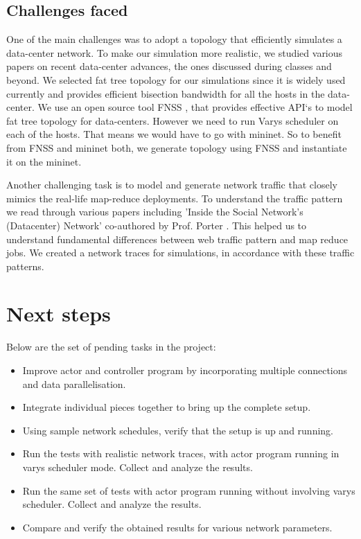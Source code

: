 \documentclass{article}
\begin{document}
\subsection{Challenges faced}
One of the main challenges was to adopt a topology that efficiently simulates a data-center network. To make our simulation more realistic, we studied various papers on recent data-center advances, the ones discussed during classes and beyond. We selected fat tree topology for our simulations since it is widely used currently and provides efficient bisection bandwidth for all the hosts in the data-center. We use an open source tool FNSS \cite{fnss}, that provides effective API`s to model fat tree topology for data-centers. However we need to run Varys scheduler on each of the hosts. That means we would have to go with mininet. So to benefit from FNSS and mininet both, we generate topology using FNSS and instantiate it on the mininet.

Another challenging task is to model and generate network traffic that closely mimics the real-life map-reduce deployments. To understand the traffic pattern we read through various papers including 'Inside the Social Network's (Datacenter) Network' co-authored by Prof. Porter \cite{facebook}. This helped us to understand fundamental differences between web traffic pattern and map reduce jobs. We created a network traces for simulations, in accordance with these traffic patterns.

\section{Next steps}

Below are the set of pending tasks in the project:

\begin{itemize}
\item Improve actor and controller program by incorporating multiple connections and data parallelisation.
\item Integrate individual pieces together to bring up the complete setup.
\item Using sample network schedules, verify that the setup is up and running.
\item Run the tests with realistic network traces, with actor program running in varys scheduler mode. Collect and analyze the results.
\item Run the same set of tests with actor program running without involving varys scheduler. Collect and analyze the results.
\item Compare and verify the obtained results for various network parameters.
\end{itemize}
\end{document}
